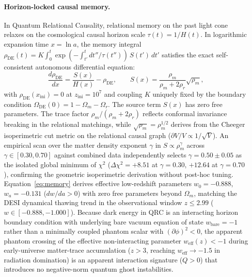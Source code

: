 \documentclass[11pt]{article}
\theoremstyle{definition}
\theoremstyle{remark}
\begin{document}
\paragraph{Horizon-locked causal memory.} In Quantum Relational Causality, relational
memory on the past light cone relaxes on the cosmological causal horizon scale
$\tau(t)=1/H(t)$. In logarithmic expansion time $x=\ln a$, the memory integral
$\rho_{\mathrm{DE}}(t)=K\int_0^t \exp(-\int_{t'}^t dt''/\tau(t''))\,S(t')\,dt'$
satisfies the exact self-consistent autonomous differential equation:
\begin{equation}
\frac{d\rho_{\mathrm{DE}}}{dx}=\frac{S(x)}{H(x)}-\rho_{\mathrm{DE}},\qquad
S(x)=\frac{\rho_m}{\rho_m+2\rho_r}\sqrt{\rho_m},
\label{eq:memory}
\end{equation}
with $\rho_{\mathrm{DE}}(x_{\mathrm{ini}})=0$ at $z_{\mathrm{ini}}=10^7$ and coupling $K$
uniquely fixed by the boundary condition $\Omega_{\mathrm{DE}}(0)=1-\Omega_m-\Omega_r$.
The source term $S(x)$ has zero free parameters. The trace factor $\rho_m/(\rho_m+2\rho_r)$
reflects conformal invariance breaking in the relational matchings, while $\sqrt{\rho_m}=\rho_m^{1/2}$
derives from the Cheeger isoperimetric cut metric on the relational causal graph ($\partial V/V \propto 1/\sqrt{V}$).
An empirical scan over the matter density exponent $\gamma$ in $S\propto \rho_m^\gamma$ across
$\gamma \in [0.30, 0.70]$ against combined data independently selects $\gamma=0.50\pm0.05$ as the
isolated global minimum of $\chi^2$ ($\Delta\chi^2=+8.51$ at $\gamma=0.30$, $+12.64$ at $\gamma=0.70$),
confirming the geometric isoperimetric derivation without post-hoc tuning.
Equation~\eqref{eq:memory} derives effective low-redshift parameters $w_0=-0.888$, $w_a=-0.131$
($dw/da > 0$) with zero free parameters beyond $\Omega_m$, matching the DESI dynamical thawing trend in
the observational window $z \le 2.99$ ($w \in [-0.888, -1.000]$). Because dark energy in QRC is an interacting
horizon boundary condition with underlying bare vacuum equation of state $w_{\mathrm{bare}}=-1$ rather than a
minimally coupled phantom scalar with $(\partial\phi)^2 < 0$, the apparent phantom crossing of the effective
non-interacting parameter $w_{\mathrm{eff}}(z) < -1$ during early-universe matter-trace accumulation ($z > 3$,
reaching $w_{\mathrm{eff}} \to -1.5$ in radiation domination) is an apparent interaction signature ($Q > 0$)
that introduces no negative-norm quantum ghost instabilities.
\end{document}
